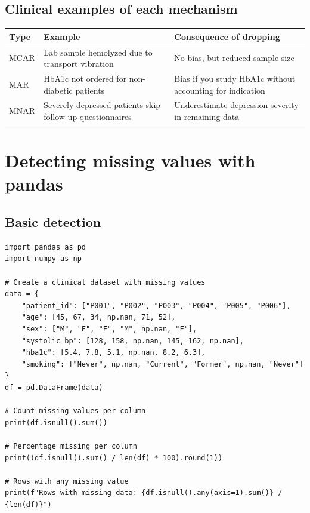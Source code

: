 \subsection{Clinical examples of each mechanism}

\begin{center}
\begin{tabular}{lp{5cm}p{5cm}}
\toprule
\textbf{Type} & \textbf{Example} & \textbf{Consequence of dropping} \\
\midrule
MCAR & Lab sample hemolyzed due to transport vibration & No bias, but reduced sample size \\
MAR & HbA1c not ordered for non-diabetic patients & Bias if you study HbA1c without accounting for indication \\
MNAR & Severely depressed patients skip follow-up questionnaires & Underestimate depression severity in remaining data \\
\bottomrule
\end{tabular}
\end{center}

\section{Detecting missing values with pandas}

\subsection{Basic detection}

\begin{verbatim}
import pandas as pd
import numpy as np

# Create a clinical dataset with missing values
data = {
    "patient_id": ["P001", "P002", "P003", "P004", "P005", "P006"],
    "age": [45, 67, 34, np.nan, 71, 52],
    "sex": ["M", "F", "F", "M", np.nan, "F"],
    "systolic_bp": [128, 158, np.nan, 145, 162, np.nan],
    "hba1c": [5.4, 7.8, 5.1, np.nan, 8.2, 6.3],
    "smoking": ["Never", np.nan, "Current", "Former", np.nan, "Never"]
}
df = pd.DataFrame(data)

# Count missing values per column
print(df.isnull().sum())

# Percentage missing per column
print((df.isnull().sum() / len(df) * 100).round(1))

# Rows with any missing value
print(f"Rows with missing data: {df.isnull().any(axis=1).sum()} / {len(df)}")
\end{verbatim}

